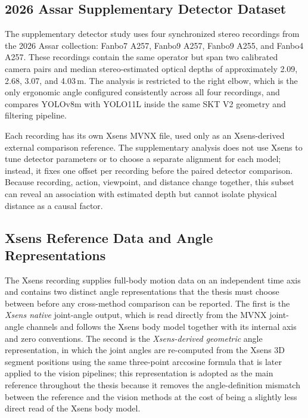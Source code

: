 \documentclass[12pt,a4paper]{article}
\begin{document}
\subsection{2026 Assar Supplementary Detector Dataset}
\label{sec:assar_supplement}

The supplementary detector study uses four synchronized stereo recordings
from the 2026 Assar collection: Fanbo7 A257, Fanbo9 A257, Fanbo9 A255, and
Fanbo4 A257.  These recordings contain the same operator but span two
calibrated camera pairs and median stereo-estimated optical depths of
approximately 2.09, 2.68, 3.07, and 4.03\,m.  The analysis is restricted to
the right elbow, which is the only ergonomic angle configured consistently
across all four recordings, and compares YOLOv8m with YOLO11L inside the same
SKT V2 geometry and filtering pipeline.

Each recording has its own Xsens MVNX file, used only as an Xsens-derived
external comparison reference.  The supplementary analysis does not use
Xsens to tune detector parameters or to choose a separate alignment for each
model; instead, it fixes one offset per recording before the paired detector
comparison.  Because recording, action, viewpoint, and distance change
together, this subset can reveal an association with estimated depth but
cannot isolate physical distance as a causal factor.

\subsection{Xsens Reference Data and Angle Representations}

The Xsens recording supplies full-body motion data on an independent time
axis and contains two distinct angle representations that the thesis must
choose between before any cross-method comparison can be reported.
The first is the \emph{Xsens native} joint-angle output, which is read
directly from the MVNX joint-angle channels and follows the Xsens body
model together with its internal axis and zero conventions.
The second is the \emph{Xsens-derived geometric} angle representation, in
which the joint angles are re-computed from the Xsens 3D segment positions
using the same three-point arccosine formula that is later applied to the
vision pipelines; this representation is adopted as the main reference
throughout the thesis because it removes the angle-definition mismatch
between the reference and the vision methods at the cost of being a
slightly less direct read of the Xsens body model.
\end{document}
